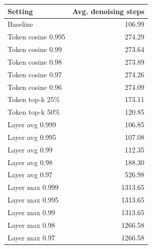 \begin{tabular}{lr}
\toprule
Setting & Avg. denoising steps \\
\midrule
Baseline & 106.99 \\
\midrule
Token cosine 0.995 & 274.29 \\
Token cosine 0.99 & 273.64 \\
Token cosine 0.98 & 273.89 \\
Token cosine 0.97 & 274.26 \\
Token cosine 0.96 & 274.09 \\
Token top-k 25\% & 173.11 \\
Token top-k 50\% & 120.85 \\
\midrule
Layer avg 0.999 & 106.85 \\
Layer avg 0.995 & 107.08 \\
Layer avg 0.99 & 112.35 \\
Layer avg 0.98 & 188.30 \\
Layer avg 0.97 & 526.98 \\
\midrule
Layer max 0.999 & 1313.65 \\
Layer max 0.995 & 1313.65 \\
Layer max 0.99 & 1313.65 \\
Layer max 0.98 & 1266.58 \\
Layer max 0.97 & 1266.58 \\
\bottomrule
\end{tabular}

